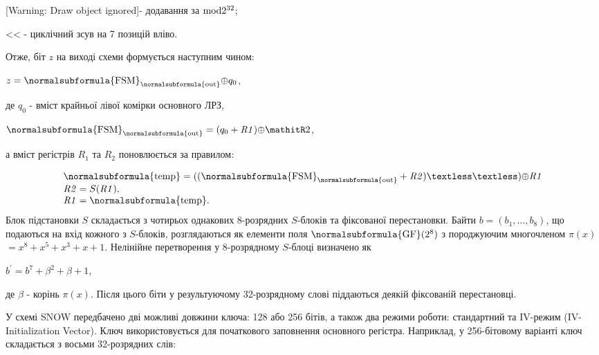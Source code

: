 [Warning: Draw object ignored]{}- додавання за  $\text{mod}2^{\text32}$;

{\textless}{\textless} {}- циклічний зсув на 7 позицій вліво.

Отже, біт  $z$ на виході схеми формується наступним чином:

{\centering

$z=\normalsubformula{\text{FSM}}_{\normalsubformula{\text{out}}}{\oplus}q_0$,
\par}

де  $q_0$ - вміст крайньої лівої комірки  основного ЛРЗ,

{\centering

$\normalsubformula{\text{FSM}}_{\normalsubformula{\text{out}}}=(q_{0}+\mathit{R1}){\oplus}\mathitR2$,
\par}

а вміст регістрів  $R_1$ та  $R_2$ поновлюється за правилом:

\begin{equation*}
\begin{matrix}{\normalsubformula{\text{temp}}=((\normalsubformula{\text{FSM}}_{\normalsubformula{\text{out}}}+\mathit{R2})\text{\textless}{\textless}){\oplus}\mathit{R1}}\hfill\null
\\\mathit{R2}=S(\mathit{R1}),\hfill\null
\\\mathit{R1}=\normalsubformula{\text{temp}}\text{.}\hfill\null
\end{matrix}\hfill 
\end{equation*}
Блок підстановки  $S$ складається з чотирьох однакових 8-розрядних 
$S${}-блоків та фіксованої перестановки. Байти 
$b=(b_{1},\dots,b_8)$, що подаються на вхід кожного
з  $S${}-блоків, розглядаються як елементи поля 
$\normalsubformula{\text{GF}}(2^8)$ з породжуючим многочленом   ${\pi
(x)}$ $=x^{8}+x^{5}+x^3+x+1$. Нелінійне перетворення у 8-розрядному 
$S${}-блоці визначено як

{\centering
 ${b}^{'}=b^{7}+\beta ^2+\beta +1$,
\par}

де  $\beta $ - корінь  $\pi (x)$. Після цього біти у результуючому
32-розрядному слові піддаються деякій фіксованій перестановці.


\bigskip

{\par}


\bigskip

У схемі SNOW передбачено дві можливі довжини ключа: 128 або 256 бітів, а також
два режими роботи: стандартний та IV{}-режим (IV{}- Initialization Vector).
Ключ використовується для початкового заповнення основного регістра. Наприклад,
у 256-бітовому варіанті ключ складається з восьми 32-розрядних слів: 

